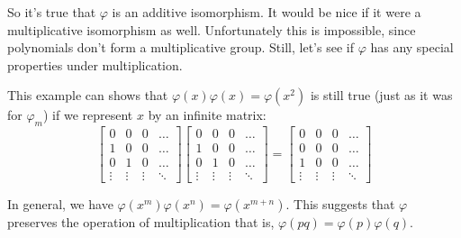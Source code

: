 So it's true that $\varphi$ is an additive isomorphism. It would be nice if it were a multiplicative isomorphism as well. Unfortunately this is impossible, since polynomials don't form a multiplicative group.  Still, let's see if $\varphi$ has any special properties under multiplication.

\begin{example}{}
This example can shows that $\varphi(x)\varphi(x) = \varphi(x^2)$ is still true (just as it was for $\varphi_m$)  if we represent $x$ by an infinite matrix:
\[\left[\begin{array}{cccccc}0 & 0 & 0 & \hdots\\1 & 0 & 0 & \hdots\\0 & 1 & 0 & \hdots\\\vdots & \vdots & \vdots & \ddots \end{array}\right]\left[\begin{array}{cccccc}0 & 0 & 0 & \hdots \\1 & 0 & 0 & \hdots\\0 & 1 & 0 & \hdots\\\vdots & \vdots & \vdots & \ddots\end{array}\right]=\left[\begin{array}{cccccc}0 & 0 & 0 & \hdots\\0 & 0 & 0 & \hdots\\1 & 0 & 0 & \hdots\\\vdots & \vdots & \vdots & \ddots\end{array}\right]\]
\end{example}

In general, we have $\varphi(x^m)\varphi(x^n) = \varphi(x^{m+n})$. This suggests that $\varphi$ preserves the operation of multiplication that is,
$ \varphi(pq) = \varphi(p)\varphi(q)$.

